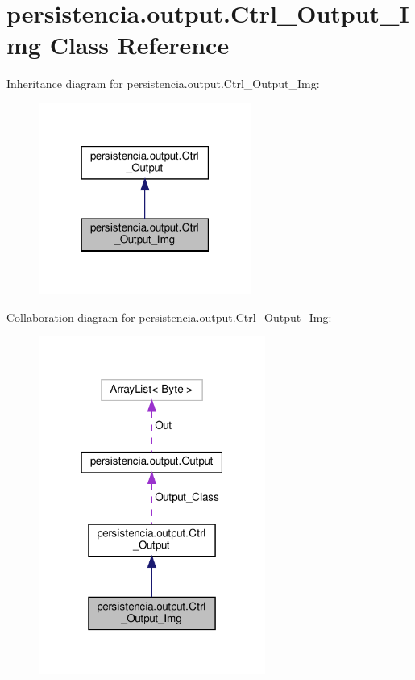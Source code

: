 \hypertarget{classpersistencia_1_1output_1_1Ctrl__Output__Img}{}\section{persistencia.\+output.\+Ctrl\+\_\+\+Output\+\_\+\+Img Class Reference}
\label{classpersistencia_1_1output_1_1Ctrl__Output__Img}


Inheritance diagram for persistencia.\+output.\+Ctrl\+\_\+\+Output\+\_\+\+Img\+:
\nopagebreak
\begin{figure}[H]
\begin{center}
\leavevmode
\includegraphics[width=198pt]{classpersistencia_1_1output_1_1Ctrl__Output__Img__inherit__graph}
\end{center}
\end{figure}


Collaboration diagram for persistencia.\+output.\+Ctrl\+\_\+\+Output\+\_\+\+Img\+:
\nopagebreak
\begin{figure}[H]
\begin{center}
\leavevmode
\includegraphics[width=211pt]{classpersistencia_1_1output_1_1Ctrl__Output__Img__coll__graph}
\end{center}
\end{figure}
